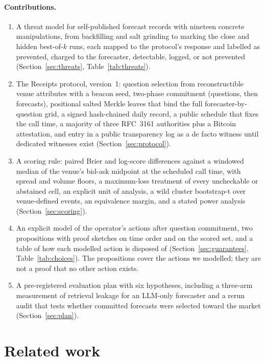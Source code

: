 \documentclass[11pt]{article}
\begin{document}
\paragraph{Contributions.}
\begin{enumerate}
  \item A threat model for self-published forecast records with nineteen concrete manipulations, from backfilling and salt grinding to marking the close and hidden best-of-$k$ runs, each mapped to the protocol's response and labelled as prevented, charged to the forecaster, detectable, logged, or not prevented (Section~\ref{sec:threats}, Table~\ref{tab:threats}).
  \item The Receipts protocol, version~1: question selection from reconstructible venue attributes with a beacon seed, two-phase commitment (questions, then forecasts), positional salted Merkle leaves that bind the full forecaster-by-question grid, a signed hash-chained daily record, a public schedule that fixes the call time, a majority of three RFC~3161 authorities plus a Bitcoin attestation, and entry in a public transparency log as a de facto witness until dedicated witnesses exist (Section~\ref{sec:protocol}).
  \item A scoring rule: paired Brier and log-score differences against a windowed median of the venue's bid-ask midpoint at the scheduled call time, with spread and volume floors, a maximum-loss treatment of every uncheckable or abstained cell, an explicit unit of analysis, a wild cluster bootstrap-t over venue-defined events, an equivalence margin, and a stated power analysis (Section~\ref{sec:scoring}).
  \item An explicit model of the operator's actions after question commitment, two propositions with proof sketches on time order and on the scored set, and a table of how each modelled action is disposed of (Section~\ref{sec:guarantees}, Table~\ref{tab:choices}). The propositions cover the actions we modelled; they are not a proof that no other action exists.
  \item A pre-registered evaluation plan with six hypotheses, including a three-arm measurement of retrieval leakage for an LLM-only forecaster and a rerun audit that tests whether committed forecasts were selected toward the market (Section~\ref{sec:plan}).
\end{enumerate}

\section{Related work}
\label{sec:related}
\end{document}
